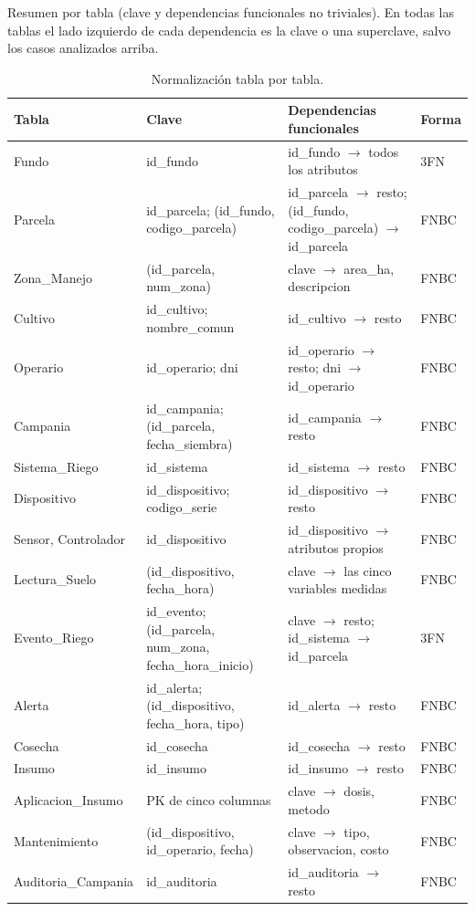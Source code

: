 \documentclass[11pt,letterpaper]{article}
\begin{document}
Resumen por tabla (clave y dependencias funcionales no triviales). En todas las tablas el lado izquierdo de cada dependencia es la clave o una superclave, salvo los casos analizados arriba.

\begin{table}[H]
\centering\footnotesize
\begin{tabularx}{\textwidth}{>{\raggedright\arraybackslash}p{3.2cm}>{\raggedright\arraybackslash}p{3.6cm}>{\raggedright\arraybackslash}X>{\centering\arraybackslash}p{1.2cm}}
\toprule
\textbf{Tabla} & \textbf{Clave} & \textbf{Dependencias funcionales} & \textbf{Forma} \\
\midrule
Fundo & id\_fundo & id\_fundo $\to$ todos los atributos & 3FN \\
Parcela & id\_parcela; (id\_fundo, codigo\_parcela) & id\_parcela $\to$ resto; (id\_fundo, codigo\_parcela) $\to$ id\_parcela & FNBC \\
Zona\_Manejo & (id\_parcela, num\_zona) & clave $\to$ area\_ha, descripcion & FNBC \\
Cultivo & id\_cultivo; nombre\_comun & id\_cultivo $\to$ resto & FNBC \\
Operario & id\_operario; dni & id\_operario $\to$ resto; dni $\to$ id\_operario & FNBC \\
Campania & id\_campania; (id\_parcela, fecha\_siembra) & id\_campania $\to$ resto & FNBC \\
Sistema\_Riego & id\_sistema & id\_sistema $\to$ resto & FNBC \\
Dispositivo & id\_dispositivo; codigo\_serie & id\_dispositivo $\to$ resto & FNBC \\
Sensor, Controlador & id\_dispositivo & id\_dispositivo $\to$ atributos propios & FNBC \\
Lectura\_Suelo & (id\_dispositivo, fecha\_hora) & clave $\to$ las cinco variables medidas & FNBC \\
Evento\_Riego & id\_evento; (id\_parcela, num\_zona, fecha\_hora\_inicio) & clave $\to$ resto; id\_sistema $\to$ id\_parcela & 3FN \\
Alerta & id\_alerta; (id\_dispositivo, fecha\_hora, tipo) & id\_alerta $\to$ resto & FNBC \\
Cosecha & id\_cosecha & id\_cosecha $\to$ resto & FNBC \\
Insumo & id\_insumo & id\_insumo $\to$ resto & FNBC \\
Aplicacion\_Insumo & PK de cinco columnas & clave $\to$ dosis, metodo & FNBC \\
Mantenimiento & (id\_dispositivo, id\_operario, fecha) & clave $\to$ tipo, observacion, costo & FNBC \\
Auditoria\_Campania & id\_auditoria & id\_auditoria $\to$ resto & FNBC \\
\bottomrule
\end{tabularx}
\caption{Normalización tabla por tabla.}
\end{table}
\end{document}
